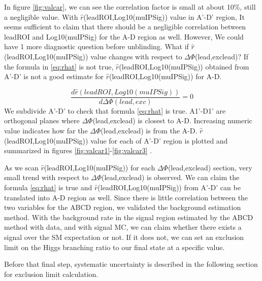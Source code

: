 In figure \ref{fig:valcar}, we can see the correlation factor is small at about 10\%, still a negligible value.
With $\hat{r}$(leadROI,Log10(muIPSig)) value in A'-D' region, It seems sufficient to claim that there should be a negligible correlation between leadROI and Log10(muIPSig) for the A-D region as well.
However, We could have 1 more diagnostic question before unblinding.
What if $\hat{r}$(leadROI,Log10(muIPSig)) value changes with respect to $\Delta\Phi$(lead,exclead)?
If the formula in \ref{eq:rhat} is not true, \newline $\hat{r}$(leadROI,Log10(muIPSig)) obtained from A'-D' is not a good estimate for $\hat{r}$(leadROI,Log10(muIPSig)) for A-D.


\begin{equation}
\label{eq:rhat}
	\frac{d\hat{r}(leadROI,Log10(muIPSig))}{d\Delta\Phi(lead,exc)}=0
\end{equation}
We subdivide A'-D' to check that formula \ref{eq:rhat} is true.
A1'-D1' are orthogonal planes where $\Delta\Phi$(lead,exclead) is closest to A-D. 
Increasing numeric value indicates how far the $\Delta\Phi$(lead,exclead) is from the A-D. 
$\hat{r}$(leadROI,Log10(muIPSig)) value for each of A'-D' region is plotted and summarized in figures \ref{fig:valcar1}-\ref{fig:valcar3} .



As we scan $\hat{r}$(leadROI,Log10(muIPSig)) for each $\Delta\Phi$(lead,exclead) section, very small trend with respect to $\Delta\Phi$(lead,exclead) is observed.
We can claim the formula \ref{eq:rhat} is true and \newline $\hat{r}$(leadROI,Log10(muIPSig)) from A'-D' can be translated into A-D region as well.
Since there is little correlation between the two variables for the ABCD region, we validated the background estimation method.
With the background rate in the signal region estimated by the ABCD method with data, and with signal MC, we can claim whether there exists a signal over the SM expectation or not.
If it does not, we can set an exclusion limit on the Higgs branching ratio to our final state at a specific value.

Before that final step, systematic uncertainty is described in the following section for exclusion limit calculation.

